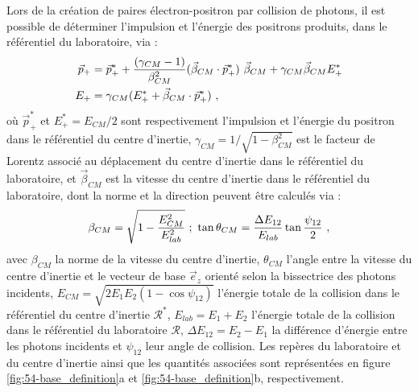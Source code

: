 \begin{refsection}
Lors de la création de paires électron-positron par collision de photons, il est possible de déterminer l'impulsion et l'énergie des positrons produits, dans le référentiel du laboratoire, via \parencite{ribeyre_2017, furry_1955}:
\begin{equation}
\begin{split}
    \vec{p}_+   &= \vec{p}_+^* + \dfrac{(\gamma_{CM} - 1)}{\beta_{CM}^2} (\vec{\beta}_{CM} \cdot \vec{p}_+^*) ~ \vec{\beta}_{CM} + \gamma_{CM} \vec{\beta}_{CM} E_+^* \\
    E_+         &= \gamma_{CM} (E_+^* + \vec{\beta}_{CM} \cdot \vec{p}_+^*) ~ \rm ,
    \label{eq:54-p+_E+_labo}
\end{split}
\end{equation}
où $\vec{p}_+^*$ et $E_+^*=E_{CM}/2$ sont respectivement l'impulsion et l'énergie du positron dans le référentiel du centre d'inertie,  $\gamma_{CM}=1/\sqrt{1-\beta_{CM}^2}$ est le facteur de Lorentz associé au déplacement du centre d'inertie dans le référentiel du laboratoire, et $\vec{\beta}_{CM}$ est la vitesse du centre d'inertie dans le référentiel du laboratoire, dont la norme et la direction peuvent être calculés via \parencite{ribeyre_2017} :
\begin{equation}
    \beta_{CM} = \sqrt{1-\dfrac{E_{CM}^2}{E_{lab}^2}} ~ ; ~ \tan{\theta_{CM}} = \dfrac{\Delta E_{12}}{E_{lab}} \tan{\dfrac{\psi_{12}}{2}} ~ \rm ,
    \label{eq:54-vitesse_cm}
\end{equation}
avec $\beta_{CM}$ la norme de la vitesse du centre d'inertie, $\theta_{CM}$ l'angle entre la vitesse du centre d'inertie et le vecteur de base $\vec{e}_z$ orienté selon la bissectrice des photons incidents, $E_{CM}=\sqrt{2 E_1 E_2 (1-\cos\psi_{12})}$ l'énergie totale de la collision dans le référentiel du centre d'inertie $\mathcal{R}^*$, $E_{lab}=E_1+E_2$ l'énergie totale de la collision dans le référentiel du laboratoire $\mathcal{R}$, $\Delta E_{12}=E_2-E_1$ la différence d'énergie entre les photons incidents et $\psi_{12}$ leur angle de collision. Les repères du laboratoire et du centre d'inertie ainsi que les quantités associées sont représentées en figure \ref{fig:54-base_definition}a et \ref{fig:54-base_definition}b, respectivement.


\end{refsection}
